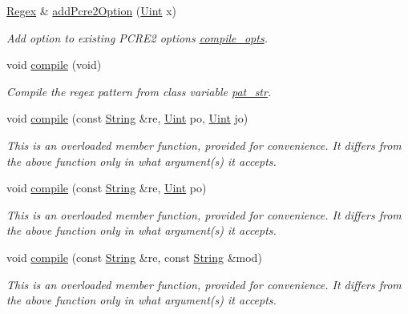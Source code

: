 \begin{DoxyCompactItemize}
\hyperlink{classjpcre2_1_1Regex}{Regex} \& \hyperlink{classjpcre2_1_1Regex_a2c7dcf12f26b2b046e147b013c8b5087}{add\+Pcre2\+Option} (\hyperlink{namespacejpcre2_a078242d38221a13fb3543b9edd78c099}{Uint} x)
\begin{DoxyCompactList}\small\item\em Add option to existing P\+C\+R\+E2 options \hyperlink{classjpcre2_1_1Regex_a5954131e9085de63229ed5c11417df69}{compile\+\_\+opts}. \end{DoxyCompactList}\item 
void \hyperlink{classjpcre2_1_1Regex_aad1d5ef1e87f762f68a587eec4022e69}{compile} (void)
\begin{DoxyCompactList}\small\item\em Compile the regex pattern from class variable \hyperlink{classjpcre2_1_1Regex_a0bceb85b6dbba355b56b5cc312214435}{pat\+\_\+str}. \end{DoxyCompactList}\item 
void \hyperlink{classjpcre2_1_1Regex_a4640915bc907aa3b80da543f1eb7e74f}{compile} (const \hyperlink{namespacejpcre2_a91f03070152fb228bc116c5a737f1d16}{String} \&re, \hyperlink{namespacejpcre2_a078242d38221a13fb3543b9edd78c099}{Uint} po, \hyperlink{namespacejpcre2_a078242d38221a13fb3543b9edd78c099}{Uint} jo)
\begin{DoxyCompactList}\small\item\em This is an overloaded member function, provided for convenience. It differs from the above function only in what argument(s) it accepts. \end{DoxyCompactList}\item 
void \hyperlink{classjpcre2_1_1Regex_a01394dcb222c4d442cabbffb4bcf570a}{compile} (const \hyperlink{namespacejpcre2_a91f03070152fb228bc116c5a737f1d16}{String} \&re, \hyperlink{namespacejpcre2_a078242d38221a13fb3543b9edd78c099}{Uint} po)
\begin{DoxyCompactList}\small\item\em This is an overloaded member function, provided for convenience. It differs from the above function only in what argument(s) it accepts. \end{DoxyCompactList}\item 
void \hyperlink{classjpcre2_1_1Regex_acd49e856009160c622e90b81b6557d8d}{compile} (const \hyperlink{namespacejpcre2_a91f03070152fb228bc116c5a737f1d16}{String} \&re, const \hyperlink{namespacejpcre2_a91f03070152fb228bc116c5a737f1d16}{String} \&mod)
\begin{DoxyCompactList}\small\item\em This is an overloaded member function, provided for convenience. It differs from the above function only in what argument(s) it accepts. \end{DoxyCompactList}\item 

\end{DoxyCompactItemize}
